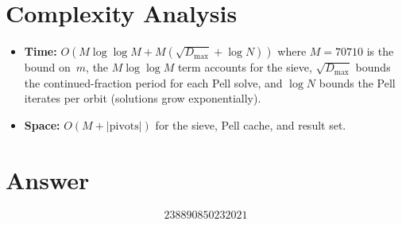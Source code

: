 \documentclass[12pt]{article}
\begin{document}
\section{Complexity Analysis}

\begin{itemize}
\item \textbf{Time:} $O(M\log\log M + M(\sqrt{D_{\max}} + \log N))$ where $M = 70710$ is the bound on~$m$, the $M\log\log M$ term accounts for the sieve, $\sqrt{D_{\max}}$ bounds the continued-fraction period for each Pell solve, and $\log N$ bounds the Pell iterates per orbit (solutions grow exponentially).
\item \textbf{Space:} $O(M + |\mathrm{pivots}|)$ for the sieve, Pell cache, and result set.
\end{itemize}

\section{Answer}

\[
\boxed{238890850232021}
\]
\end{document}
